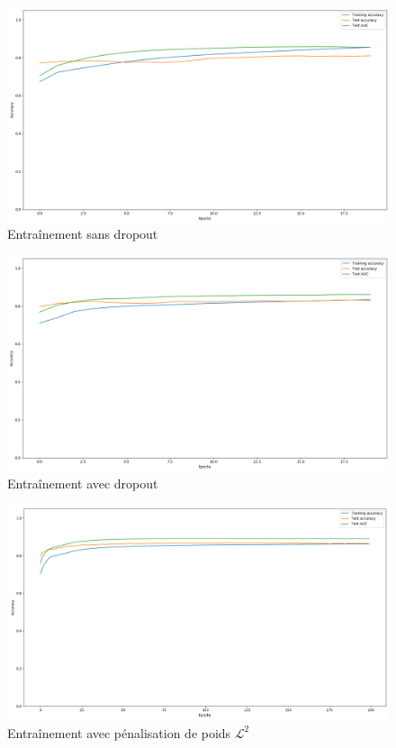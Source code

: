 \documentclass[a4paper,11pt]{article}
\begin{document}
	\begin{figure}[H]
	    \centering
	    \includegraphics[scale=0.3]{overfitting_without_dropout.png}
	    \caption{Entraînement sans dropout}
	    \label{fig:overfitting_without_dropout}
	\end{figure}

	\begin{figure}[H]
	    \centering
	    \includegraphics[scale=0.3]{overfitting_with_dropout.png}
	    \caption{Entraînement avec dropout}
	    \label{fig:overfitting_with_dropout}
	\end{figure}

	\begin{figure}[H]
	    \centering
	    \includegraphics[scale=0.3]{l2_regularization_200.png}
	    \caption{Entraînement avec pénalisation de poids $\mathcal{L}^2$}
	    \label{fig:l2_regularization}
	\end{figure}
\end{document}
